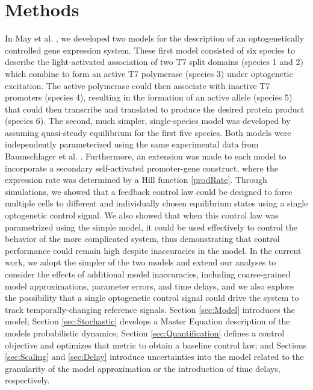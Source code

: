 \documentclass[12pt]{iopart}
\begin{document}
\section{Methods}
In May et al. \cite{May2021}, we developed two models for the description of an optogenetically controlled gene expression system.
These first model consisted of six species to describe the light-activated association of two T7 split domains (species 1 and 2) which combine to form an active T7 polymerase (species 3) under optogenetic excitation. 
The active polymerase could then associate with inactive T7 promoters (species 4), resulting in the formation of an active allele (species 5) that could then transcribe and translated to produce the desired protein product (species 6). 
The second, much simpler, single-species model was developed by assuming quasi-steady equilibrium for the first five species. 
Both models were independently parameterized using the same experimental data from Baumschlager et al. . 
Furthermore, an extension was made to each model to incorporate a secondary self-activated promoter-gene construct, where the expression rate was determined by a Hill function \ref{prodRate}.
Through simulations, we showed that a feedback control law could be designed to force multiple cells to different and individually chosen equilibrium states using a single optogenetic control signal. 
We also showed that when this control law was parametrized using the simple model, it could be used effectively to control the behavior of the more complicated system, thus demonstrating that control performance could remain high despite inaccuracies in the model.
In the current work, we adopt the simpler of the two models and extend our analyses to consider the effects of additional model inaccuracies, including coarse-grained model approximations, parameter errors, and time delays, and we also explore the possibility that a single optogenetic control signal could drive the system to track temporally-changing reference signals.
Section \ref{sec:Model} introduces the model; Section \ref{sec:Stochastic} develops a Master Equation description of the models probabilistic dynamics; Section \ref{sec:Quantification} defines a control objective and optimizes that metric to obtain a baseline control law; and Sections \ref{sec:Scaling} and \ref{sec:Delay} introduce uncertainties into the model related to the granularity of the model approximation or the introduction of time delays, respectively. 
\end{document}
